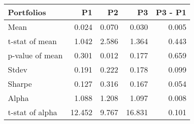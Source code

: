 \begin{tabular}{lrrrr}
\toprule
Portfolios & P1 & P2 & P3 & P3 - P1 \\
\midrule
Mean & 0.024 & 0.070 & 0.030 & 0.005 \\
t-stat of mean & 1.042 & 2.586 & 1.364 & 0.443 \\
p-value of mean & 0.301 & 0.012 & 0.177 & 0.659 \\
Stdev & 0.191 & 0.222 & 0.178 & 0.099 \\
Sharpe & 0.127 & 0.316 & 0.167 & 0.054 \\
Alpha & 1.088 & 1.208 & 1.097 & 0.008 \\
t-stat of alpha & 12.452 & 9.767 & 16.831 & 0.101 \\
\bottomrule
\end{tabular}
